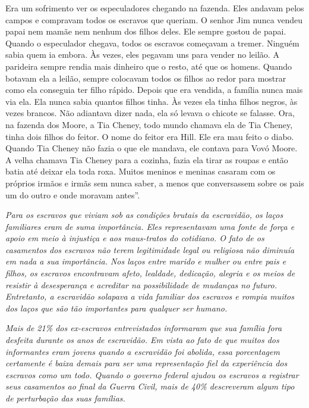 Era um sofrimento ver os especuladores chegando na fazenda. Eles andavam
pelos campos e compravam todos os escravos que queriam. O senhor Jim
nunca vendeu papai nem mamãe nem nenhum dos filhos deles. Ele sempre
gostou de papai. Quando o especulador chegava, todos os escravos
começavam a tremer. Ninguém sabia quem ia embora. Às vezes, eles pegavam
uns para vender no leilão. A parideira sempre rendia mais dinheiro que o
resto, até que os homens. Quando botavam ela a leilão, sempre colocavam
todos os filhos ao redor para mostrar como ela conseguia ter filho
rápido. Depois que era vendida, a família nunca mais via ela. Ela nunca
sabia quantos filhos tinha. Às vezes ela tinha filhos negros, às vezes
brancos. Não adiantava dizer nada, ela só levava o chicote se falasse.
Ora, na fazenda dos Moore, a Tia Cheney, todo mundo chamava ela de Tia
Cheney, tinha dois filhos do feitor. O nome do feitor era Hill. Ele era
mau feito o diabo. Quando Tia Cheney não fazia o que ele mandava, ele
contava para Vovó Moore. A velha chamava Tia Cheney para a cozinha,
fazia ela tirar as roupas e então batia até deixar ela toda roxa. Muitos
meninos e meninas casaram com os próprios irmãos e irmãs sem nunca
saber, a menos que conversassem sobre os pais um do outro e onde moravam
antes''.

\emph{Para os escravos que viviam sob as condições brutais da
escravidão, os laços familiares eram de suma importância. Eles
representavam uma fonte de força e apoio em meio à injustiça e aos
maus-tratos do cotidiano. O fato de os casamentos dos escravos não terem
legitimidade legal ou religiosa não diminuía em nada a sua importância.
Nos laços entre marido e mulher ou entre pais e filhos, os escravos
encontravam afeto, lealdade, dedicação, alegria e os meios de resistir à
desesperança e acreditar na possibilidade de mudanças no futuro.
Entretanto, a escravidão solapava a vida familiar dos escravos e rompia
muitos dos laços que são tão importantes para qualquer ser humano.}

\emph{Mais de 21\% dos ex-escravos entrevistados informaram que sua
família fora desfeita durante os anos de escravidão. Em vista ao fato de
que muitos dos informantes eram jovens quando a escravidão foi abolida,
essa porcentagem certamente é baixa demais para ser uma representação
fiel da experiência dos escravos como um todo. Quando o governo federal
ajudou os escravos a registrar seus casamentos ao final da Guerra Civil,
mais de 40\% descreveram algum tipo de perturbação das suas famílias. }

